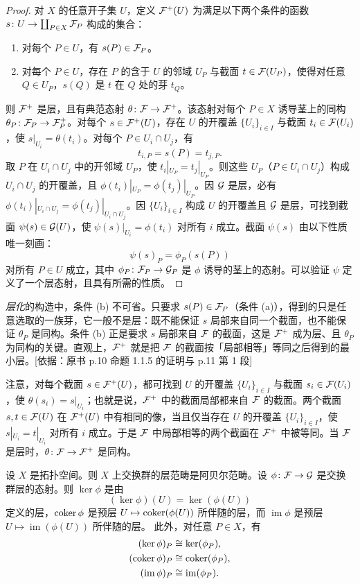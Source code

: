 \begin{proof}
对 $X$ 的任意开子集 $U$，定义 $\mathcal{F}^+(U)$ 为满足以下两个条件的函数 $s\colon U\to\coprod_{P\in X}\mathcal{F}_P$ 构成的集合：
\begin{enumerate}[label=(\alph*),leftmargin=2.8em]
  \item 对每个 $P\in U$，有 $s(P)\in\mathcal{F}_P$。
  \item 对每个 $P\in U$，存在 $P$ 的含于 $U$ 的邻域 $U_P$ 与截面 $t\in\mathcal{F}(U_P)$，使得对任意 $Q\in U_P$，$s(Q)$ 是 $t$ 在 $Q$ 处的芽 $t_Q$。
\end{enumerate}
则 $\mathcal{F}^+$ 是层，且有典范态射 $\theta\colon\mathcal{F}\to\mathcal{F}^+$。该态射对每个 $P\in X$ 诱导茎上的同构 $\theta_P\colon\mathcal{F}_P\to\mathcal{F}^+_P$。对每个 $s\in\mathcal{F}^+(U)$，存在 $U$ 的开覆盖 $\{U_i\}_{i\in I}$ 与截面 $t_i\in\mathcal{F}(U_i)$，使 $s|_{U_i}=\theta(t_i)$。对每个 $P\in U_i\cap U_j$，有
\[
t_{i,P}=s(P)=t_{j,P}.
\]
取 $P$ 在 $U_i\cap U_j$ 中的开邻域 $U_P$，使 $t_i|_{U_P}=t_j|_{U_P}$。则这些 $U_P$（$P\in U_i\cap U_j$）构成 $U_i\cap U_j$ 的开覆盖，且 $\phi(t_i)|_{U_P}=\phi(t_j)|_{U_P}$。因 $\mathcal{G}$ 是层，必有 $\phi(t_i)|_{U_i\cap U_j}=\phi(t_j)|_{U_i\cap U_j}$。因 $\{U_i\}_{i\in I}$ 构成 $U$ 的开覆盖且 $\mathcal{G}$ 是层，可找到截面 $\psi(s)\in\mathcal{G}(U)$，使 $\psi(s)|_{U_i}=\phi(t_i)$ 对所有 $i$ 成立。截面 $\psi(s)$ 由以下性质唯一刻画：
\[
\psi(s)_P=\phi_P(s(P))
\]
对所有 $P\in U$ 成立，其中 $\phi_P\colon\mathcal{F}_P\to\mathcal{G}_P$ 是 $\phi$ 诱导的茎上的态射。可以验证 $\psi$ 定义了一个层态射，且具有所需的性质。
\end{proof}
\begin{tnote}
\emph{层化}的构造中，条件 (b) 不可省。只要求 $s(P)\in\mathcal{F}_P$（条件 (a)），得到的只是任意选取的一族芽，它一般不是层：既不能保证 $s$ 局部来自同一个截面，也不能保证 $\theta_P$ 是同构。条件 (b) 正是要求 $s$ 局部来自 $\mathcal{F}$ 的截面，这是 $\mathcal{F}^+$ 成为层、且 $\theta_P$ 为同构的关键。直观上，$\mathcal{F}^+$ 就是把 $\mathcal{F}$ 的截面按「局部相等」等同之后得到的最小层。[依据：原书 p.10 命题 1.1.5 的证明与 p.11 第 1 段]
\end{tnote}

注意，对每个截面 $s\in\mathcal{F}^+(U)$，都可找到 $U$ 的开覆盖 $\{U_i\}_{i\in I}$ 与截面 $s_i\in\mathcal{F}(U_i)$，使 $\theta(s_i)=s|_{U_i}$；也就是说，$\mathcal{F}^+$ 中的截面局部都来自 $\mathcal{F}$ 的截面。两个截面 $s,t\in\mathcal{F}(U)$ 在 $\mathcal{F}^+(U)$ 中有相同的像，当且仅当存在 $U$ 的开覆盖 $\{U_i\}_{i\in I}$，使 $s|_{U_i}=t|_{U_i}$ 对所有 $i$ 成立。于是 $\mathcal{F}$ 中局部相等的两个截面在 $\mathcal{F}^+$ 中被等同。当 $\mathcal{F}$ 是层时，$\theta\colon\mathcal{F}\to\mathcal{F}^+$ 是同构。

\begin{proposition}\label{it:1.1.6}
设 $X$ 是拓扑空间。则 $X$ 上交换群的层范畴是阿贝尔范畴。设 $\phi\colon\mathcal{F}\to\mathcal{G}$ 是交换群层的态射。则 $\ker\phi$ 是由
\[
(\ker\phi)(U)=\ker(\phi(U))
\]
定义的层，$\operatorname{coker}\phi$ 是预层 $U\mapsto\operatorname{coker}(\phi(U))$ 所伴随的层，而 $\operatorname{im}\phi$ 是预层 $U\mapsto\operatorname{im}(\phi(U))$ 所伴随的层。
此外，对任意 $P\in X$，有
\[
\begin{aligned}
(\ker\phi)_P&\cong\ker(\phi_P),\\
(\operatorname{coker}\phi)_P&\cong\operatorname{coker}(\phi_P),\\
(\operatorname{im}\phi)_P&\cong\operatorname{im}(\phi_P).
\end{aligned}
\]
\end{proposition}


